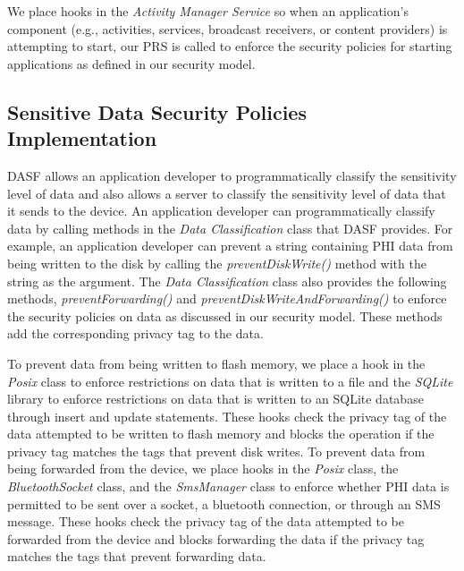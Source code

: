 We place hooks in the \textit{Activity Manager Service} so when an
application's component (e.g., activities, services, broadcast receivers, or
content providers) is attempting to start, our PRS is called to enforce the
security policies for starting applications as defined in our security model.

\subsection{Sensitive Data Security Policies Implementation}  

DASF allows an application developer to programmatically classify the
sensitivity level of data and also allows a server to classify the sensitivity
level of data that it sends to the device.  An application developer can
programmatically classify data by calling methods in the \textit{Data
Classification} class that DASF provides. For example, an application developer
can prevent a string containing PHI data from being written to the disk by
calling the \textit{preventDiskWrite()} method with the string as the argument.
The \textit{Data Classification} class also provides the following methods,
\textit{preventForwarding()} and \textit{preventDiskWriteAndForwarding()} to
enforce the security policies on data as discussed in our security model.
These methods add the corresponding privacy tag to the data.

To prevent data from being written to flash memory, we place a hook in the
\textit{Posix} class to enforce restrictions on data that is written to a file
and the \textit{SQLite} library to enforce restrictions on data that is written
to an SQLite database through insert and update statements.  These hooks check
the privacy tag of the data attempted to be written to flash memory and blocks
the operation if the privacy tag matches the tags that prevent disk writes.  
To prevent data from being forwarded from the device, we place hooks in the
\textit{Posix} class, the \textit{BluetoothSocket} class, and the
\textit{SmsManager} class to enforce whether PHI data is permitted to be sent
over a socket, a bluetooth connection, or through an SMS message.  These hooks
check the privacy tag of the data attempted to be forwarded from the device and
blocks forwarding the data if the privacy tag matches the tags that prevent
forwarding data.

